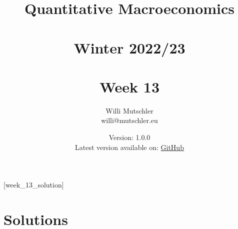 
\newif\ifDisplaySolutions\DisplaySolutionstrue


\title{Quantitative Macroeconomics\\~\\Winter 2022/23\\~\\Week 13}
\author{Willi Mutschler\\willi@mutschler.eu}
\date{Version: 1.0.0\\Latest version available on: \href{https://github.com/wmutschl/Quantitative-Macroeconomics/releases/latest/download/week_13.pdf}{GitHub}}
\maketitle\thispagestyle{empty}

\newpage
{}[week_13_solution]
\tableofcontents\thispagestyle{empty}\newpage

\setcounter{page}{1}
\newpage
\newpage
\newpage
\printbibliography

\ifDisplaySolutions
\newpage
\appendix

\section{Solutions}

\fi
